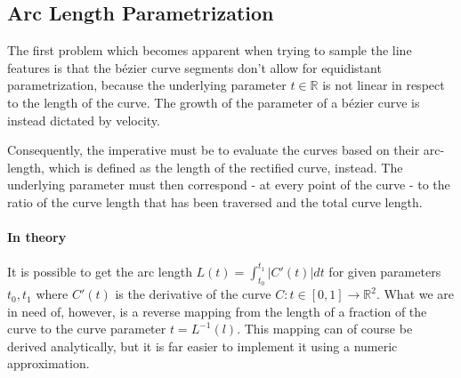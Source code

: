 \subsection{Arc Length Parametrization}
The first problem which becomes apparent when trying to sample the line features is that the b\'{e}zier curve segments don't allow for equidistant parametrization, because the underlying parameter $t \in \mathbb{R}$ is not linear in respect to the length of the curve. The growth of the parameter of a b\'{e}zier curve is instead dictated by velocity.

\def\earpathf{(-1,1.5) .. controls (-1,2.3) and (1,2.8) .. (1,1.5) .. controls (1, -.2) and (0.3,-.1) .. (0.3,-1) .. controls (0.2,-1.5) and (-.5, -1.7) .. (-1,-1.25);}
\def\earpaths{(3,1.5) .. controls (3,2.3) and (5,2.8) .. (5,1.5) .. controls (5, -.2) and (4.3,-.1) .. (4.3,-1) .. controls (4.2,-1.5) and (3.5, -1.7) .. (3,-1.25);}
\begin{figure}[h!]
\centering
{}
\end{figure}
Consequently, the imperative must be to evaluate the curves based on their arc-length, which is defined as the length of the rectified curve, instead. The underlying parameter must then correspond - at every point of the curve - to the ratio of the curve length
that has been traversed and the total curve length.

\paragraph{In theory}
It is possible to get the arc length $L(t)=\int_{t_{0}}^{t_{1}} \left|C'(t)\right| dt$ for given parameters $t_{0}, t_{1}$ where $C'(t)$ is the derivative of the curve $C:t \in [0,1] \rightarrow \mathbb{R}^2$. What we are in need of, however, is a reverse mapping from the length of a fraction of the curve to the curve parameter $t = L^{-1}(l)$. 
This mapping can of course be derived analytically, but it is far easier to implement it using a numeric approximation. 


